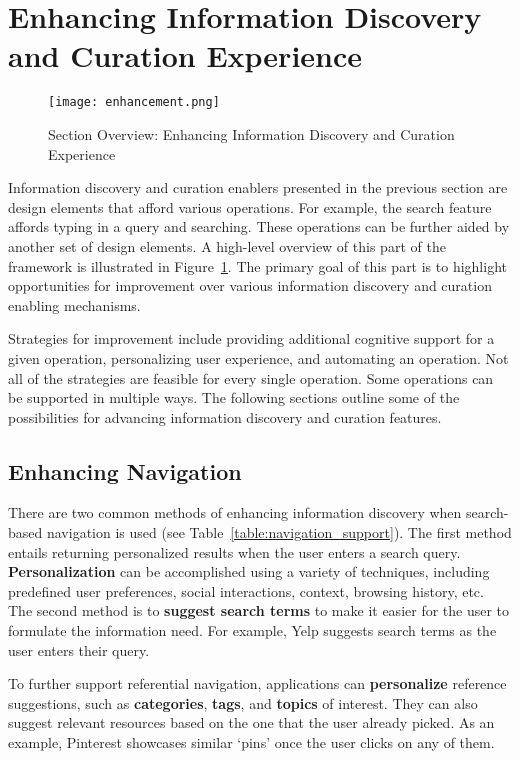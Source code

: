 {\section{Enhancing Information Discovery and Curation Experience}
\label{section:enhancing}

\begin{figure}[ht!]
	\noindent
	\centering
	\texttt{[image: enhancement.png]}
	\caption{Section Overview: Enhancing Information Discovery and Curation Experience}
	\label{fig:enhancement} 
\end{figure}
Information discovery and curation enablers presented in the previous section are design elements that afford various operations. For example, the search feature affords typing in a query and searching. These operations can be further aided by another set of design elements. A high-level overview of this part of the framework is illustrated in Figure~\ref{fig:enhancement}. The primary goal of this part is to highlight opportunities for improvement over various information discovery and curation enabling mechanisms.

Strategies for improvement include providing additional cognitive support for a given operation, personalizing user experience, and automating an operation. Not all of the strategies are feasible for every single operation. Some operations can be supported in multiple ways. The following sections outline some of the possibilities for advancing information discovery and curation features. 

{\subsection{Enhancing Navigation}
There are two common methods of enhancing information discovery when search-based navigation is used (see Table~\ref{table:navigation_support}). The first method entails returning personalized results when the user enters a search query. \textbf{Personalization} can be accomplished using a variety of techniques, including predefined user preferences, social interactions, context, browsing history, etc. The second method is to \textbf{suggest search terms} to make it easier for the user to formulate the information need. For example, Yelp suggests search terms as the user enters their query.

\pagebreak
To further support referential navigation, applications can \textbf{personalize} reference suggestions, such as \textbf{categories}, \textbf{tags}, and \textbf{topics} of interest. They can also suggest relevant resources based on the one that the user already picked. As an example, Pinterest showcases similar `pins' once the user clicks on any of them.

}}
